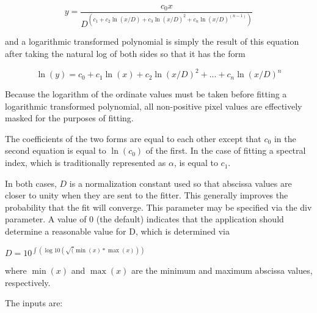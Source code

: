 \begin{equation}
y = \frac{c_0 x}{D^{(c_1 + c_2 \ln(x/D) + c_3 \ln(x/D)^2 + c_n \ln(x/D)^{(n - 1)})}}
\end{equation}

and a logarithmic transformed polynomial is simply the result of this equation after taking the natural log of both sides so that it has the form

\begin{equation}
\ln(y) = c_0 + c_1 \ln(x) + c_2 \ln(x/D)^2 +  ... + c_n \ln(x/D)^n
\end{equation}

Because the logarithm of the ordinate values must be taken before fitting a logarithmic transformed polynomial,
all non-positive pixel values are effectively masked for the purposes of fitting.

The coefficients of the two forms are equal to each other except that $c_0$ in the second equation is equal to
$\ln(c_0)$ of the first. In the case of fitting a spectral index, which is traditionally represented as $\alpha$, is
equal to $c_1$.

In both cases, $D$ is a normalization constant used so that abscissa
values are closer to unity when they are sent to the fitter. This
generally improves the probability that the fit will converge. This
parameter may be specified via the div parameter. A value of 0 (the
default) indicates that the application should determine a reasonable
value for D, which is determined via

$D = 10^{\int(\log10(\sqrt(\min(x)*\max(x)))}$

where $\min(x)$ and $\max(x)$ are the minimum and maximum abscissa
values, respectively.

The inputs are:

